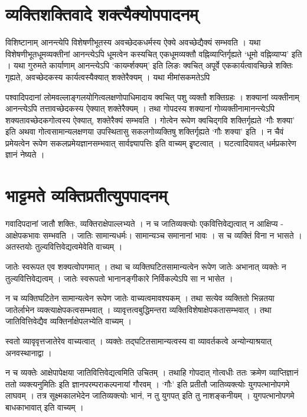 {\section*{व्यक्तिशक्तिवादे शक्त्यैक्योपपादनम्}

विशिष्टानाम् आनन्त्येपि विशेषणीभूतस्य अवच्छेदकधर्मस्य ऐक्ये अवच्छेद्यैक्यं सम्भवति । यथा विशेषणीभूतधूमव्यक्तीनां आनन्त्येऽपि धूमत्वेन कस्यचित् एकधूमव्यक्तौ वह्निव्याप्तिर्गृह्यते ‘धूमो वह्निव्याप्य’ इति  । यथा गुरुमते कार्याणाम् आनन्त्येऽपि ‘कायर्म्शक्यम्’ इति लिङः क्वचित् अपूर्वे एककार्यत्वावच्छिन्ने शक्तिः गृह्यते, अवच्छेदकस्य कार्यत्वस्यैक्यात् शक्तेरैक्यम् । यथा मीमांसकमतेऽपि 	

पश्वादिपदानां लोमवल्लाङ्गलयोगित्वलक्षणोपाधिमादाय क्वचित् पशु व्यक्तौ शक्तिग्रहः । शक्यानां व्यक्तीनाम् आनन्त्येऽपि तत्तावच्छेदकस्य ऐक्यात् शक्तेरैक्यम् । तथा गोपदस्य शक्यानां गोव्यक्तीनामानन्त्येऽपि शक्यतावच्छेदकगोत्वस्य ऐक्यात्, शक्तेरैक्यं सम्भवति । { गोत्वेन रूपेण क्वचिद्गवि शक्तिर्गृह्यते ‘गौः शक्या’ इति } अथवा गोत्वसामान्यलक्षणया उपस्थितासु सकलगोव्यक्तिषु शक्तिर्गृह्यते ‘गौः शक्या’ इति । न चैवं प्रमेयत्वेन रूपेण सकलप्रमेयज्ञानसम्भवात् सार्वज्ञ्यापत्तिः इति वाच्यम्  इृष्टत्वात् । घटत्वादियावत् धर्मप्रकारेण ज्ञानं नेष्यते ।

\section*{भाट्टमते व्यक्तिप्रतीत्युपपादनम्}

गवादिपदानां जातौ शक्तिः, व्यक्तिराक्षेपाल्लभ्यते । न च जातिव्यक्त्योः एकवित्तिवेद्यत्वात् न आक्षिप्य - आक्षेपकभावः सम्भवति । जातिः सामान्यधर्मः। सामान्यञ्च समानानां भावः । स च व्यक्तिं विना न भासते । अतस्तयोः तुल्यवित्तिवेद्यत्वमेवेति वाच्यम् ।

जातेः स्वरूपत एव शक्यत्वोपगमात् । तथा च व्यक्तिघटितसामान्यत्वेन रूपेण जातेः अभानात् व्यक्तेः न तुल्यवित्तिवेद्यत्वम् । जातेः स्वरूपतो भानानङ्गीकारे  निर्विकल्पेऽपि सा न भासेत ।

न च व्यक्तिघटितेन सामान्यत्वेन रूपेण जातेः वाच्यत्वमावश्यकम् । तथा सत्येव व्यक्तितो भिन्नतया जातेर्लाभेन व्यक्त्याक्षेपकत्वसम्भवात् । व्यावृत्तत्वबुद्धिमन्तरा व्यक्तिविशेषाक्षेपकतासम्भवात् । तथा जातिवित्तिवेद्यैव व्यक्तिर्नाक्षेपलभ्येति वाच्यम् । 

स्वतो व्यावृवृत्तजातेरेव वाच्यत्वात् । व्यक्तेः तद्घटितसामान्यत्वस्य वा व्यावर्तकत्वे अन्योन्याश्रयात्  अनवस्थानाद्वा ।

न च व्यक्तेः आक्षेपापेक्षया जातिवित्तिवेद्यत्वमिति उचितम् । तथाहि गोपदात् गोत्वधीः ततः क्रमेण व्याप्तिज्ञानं ततो व्यक्त्यनुमितिः इति ज्ञानपरम्पराकल्पनायां गौरवम् । ‘गौः’ इति प्रतीतौ जातिव्यक्त्योः युगपत्भानोपगमे लाघवम् । तत्र सूक्ष्मकालभेदेन जातिव्यक्त्योः भानं, न तु युगपत् इति तु नाशङ्कनीयम् । युगपत्भानोपगमे बाधकाभावात् इति वाच्यम् ।

}
